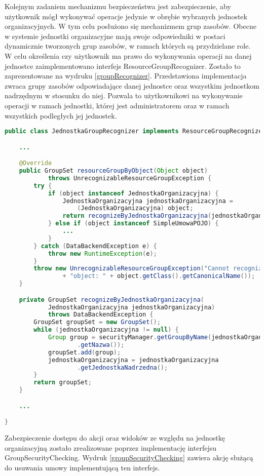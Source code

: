 Kolejnym zadaniem mechanizmu bezpieczeństwa jest zabezpieczenie, aby użytkownik mógł wykonywać operacje jedynie w obrębie wybranych jednostek organizacyjnych. W tym celu posłużono się mechanizmem grup zasobów. Obecne w systemie jednostki organizacyjne mają swoje odpowiedniki w postaci dynamicznie tworzonych grup zasobów, w ramach których są przydzielane role. W celu określenia czy użytkownik ma prawo do wykonywania operacji na danej jednostce zaimplementowano interfejs ResourceGroupRecognizer. Zostało to zaprezentowane na wydruku \ref{groupRecognizer}. Przedstawiona implementacja zwraca grupy zasobów odpowiadające danej jednostce oraz wszystkim jednostkom nadrzędnym w stosunku do niej. Pozwala to użytkownikowi na wykonywanie operacji w ramach jednostki, której jest administratorem oraz w ramach wszystkich podległych jej jednostek. 

\begin{lstlisting}[language=Java,style=outcode,showstringspaces=false,caption=Implementacja ResourceGroupRecognizer dla jednostek organizacyjnych,label={groupRecognizer}]
public class JednostkaGroupRecognizer implements ResourceGroupRecognizer {

	...

	@Override
	public GroupSet resourceGroupByObject(Object object)
			throws UnrecognizableResourceGroupException {
		try {
			if (object instanceof JednostkaOrganizacyjna) {
				JednostkaOrganizacyjna jednostkaOrganizacyjna = 
					(JednostkaOrganizacyjna) object;
				return recognizeByJednostkaOrganizacyjna(jednostkaOrganizacyjna);
			} else if (object instanceof SimpleUmowaPOJO) {
				...
			}
		} catch (DataBackendException e) {
			throw new RuntimeException(e);
		}
		throw new UnrecognizableResourceGroupException("Cannot recognize "
				+ "object: " + object.getClass().getCanonicalName());
	}

	private GroupSet recognizeByJednostkaOrganizacyjna(
			JednostkaOrganizacyjna jednostkaOrganizacyjna)
			throws DataBackendException {
		GroupSet groupSet = new GroupSet();
		while (jednostkaOrganizacyjna != null) {
			Group group = securityManager.getGroupByName(jednostkaOrganizacyjna
					.getNazwa());
			groupSet.add(group);
			jednostkaOrganizacyjna = jednostkaOrganizacyjna
					.getJednostkaNadrzedna();
		}
		return groupSet;
	}

	...

}
\end{lstlisting}

Zabezpieczenie dostępu do akcji oraz widoków ze względu na jednostkę organizacyjną zostało zrealizowane poprzez implementację interfejsu GroupSecurityChecking. Wydruk \ref{groupSecurityChecking} zawiera akcję służącą do usuwania umowy implementującą ten interfejs. 

